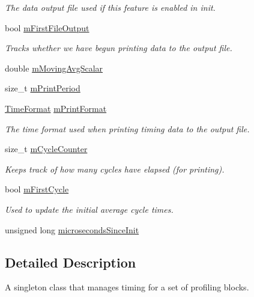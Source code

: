 \begin{CompactItemize}
\begin{CompactList}\small\item\em The data output file used if this feature is enabled in init. \item\end{CompactList}\item 
bool \hyperlink{class_j_g_t_l_1_1_profiler_e5c5d7ecb757126d6085e3b2eacbb144}{m\-First\-File\-Output}
\begin{CompactList}\small\item\em Tracks whether we have begun printing data to the output file. \item\end{CompactList}\item 
double \hyperlink{class_j_g_t_l_1_1_profiler_00cadccfc6c462cc084e827b69794363}{m\-Moving\-Avg\-Scalar}
\item 
size\_\-t \hyperlink{class_j_g_t_l_1_1_profiler_de2b79bbd0a6845cf50a47435cb5265b}{m\-Print\-Period}
\item 
\hyperlink{namespace_j_g_t_l_11a34d88ecadd1c99354adc21fd5abe6}{Time\-Format} \hyperlink{class_j_g_t_l_1_1_profiler_98b7dbee91f283a2f2a958e9f0acc4c4}{m\-Print\-Format}
\begin{CompactList}\small\item\em The time format used when printing timing data to the output file. \item\end{CompactList}\item 
size\_\-t \hyperlink{class_j_g_t_l_1_1_profiler_77a79635f96581b9038410277fb1be34}{m\-Cycle\-Counter}
\begin{CompactList}\small\item\em Keeps track of how many cycles have elapsed (for printing). \item\end{CompactList}\item 
bool \hyperlink{class_j_g_t_l_1_1_profiler_32a05ea51b894c089796b6fa0e5d2aa9}{m\-First\-Cycle}
\begin{CompactList}\small\item\em Used to update the initial average cycle times. \item\end{CompactList}\item 
unsigned long \hyperlink{class_j_g_t_l_1_1_profiler_c85e5809a50c45b86ac345af710da5c3}{microseconds\-Since\-Init}
\end{CompactItemize}


\subsection{Detailed Description}
A singleton class that manages timing for a set of profiling blocks. 



